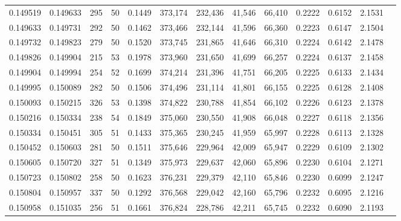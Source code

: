 \begin{tabular}{rrrrrrrrrrrrr}
0.149519 & 0.149633 &   295 &  50 &                                     0.1449 & 373,174 & 232,436 &  41,546 &  66,410 & 0.2222 & 0.6152 & 2.1531 \\
0.149633 & 0.149731 &   292 &  50 &                                     0.1462 & 373,466 & 232,144 &  41,596 &  66,360 & 0.2223 & 0.6147 & 2.1504 \\
0.149732 & 0.149823 &   279 &  50 &                                     0.1520 & 373,745 & 231,865 &  41,646 &  66,310 & 0.2224 & 0.6142 & 2.1478 \\
0.149826 & 0.149904 &   215 &  53 &                                     0.1978 & 373,960 & 231,650 &  41,699 &  66,257 & 0.2224 & 0.6137 & 2.1458 \\
0.149904 & 0.149994 &   254 &  52 &                                     0.1699 & 374,214 & 231,396 &  41,751 &  66,205 & 0.2225 & 0.6133 & 2.1434 \\
0.149995 & 0.150089 &   282 &  50 &                                     0.1506 & 374,496 & 231,114 &  41,801 &  66,155 & 0.2225 & 0.6128 & 2.1408 \\
0.150093 & 0.150215 &   326 &  53 &                                     0.1398 & 374,822 & 230,788 &  41,854 &  66,102 & 0.2226 & 0.6123 & 2.1378 \\
0.150216 & 0.150334 &   238 &  54 &                                     0.1849 & 375,060 & 230,550 &  41,908 &  66,048 & 0.2227 & 0.6118 & 2.1356 \\
0.150334 & 0.150451 &   305 &  51 &                                     0.1433 & 375,365 & 230,245 &  41,959 &  65,997 & 0.2228 & 0.6113 & 2.1328 \\
0.150452 & 0.150603 &   281 &  50 &                                     0.1511 & 375,646 & 229,964 &  42,009 &  65,947 & 0.2229 & 0.6109 & 2.1302 \\
0.150605 & 0.150720 &   327 &  51 &                                     0.1349 & 375,973 & 229,637 &  42,060 &  65,896 & 0.2230 & 0.6104 & 2.1271 \\
0.150723 & 0.150802 &   258 &  50 &                                     0.1623 & 376,231 & 229,379 &  42,110 &  65,846 & 0.2230 & 0.6099 & 2.1247 \\
0.150804 & 0.150957 &   337 &  50 &                                     0.1292 & 376,568 & 229,042 &  42,160 &  65,796 & 0.2232 & 0.6095 & 2.1216 \\
0.150958 & 0.151035 &   256 &  51 &                                     0.1661 & 376,824 & 228,786 &  42,211 &  65,745 & 0.2232 & 0.6090 & 2.1193 \\

\end{tabular}
